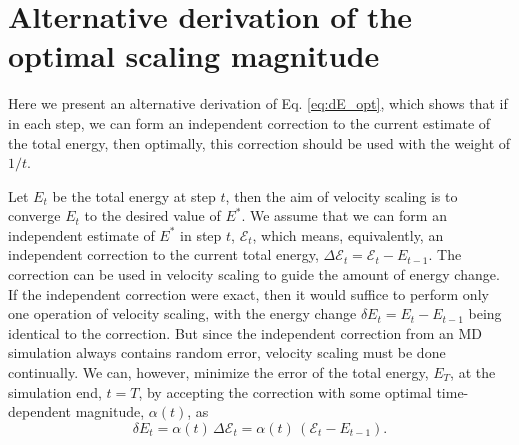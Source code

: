 \documentclass[reprint]{revtex4-1}
\begin{document}
\appendix


\section{\label{sec:error}
  Alternative derivation of
  the optimal scaling magnitude
}


Here we present an alternative derivation of Eq. \eqref{eq:dE_opt},
which shows that if in each step, we can form an independent correction
to the current estimate of the total energy,
then optimally,
this correction should be used
with the weight of $1/t$.

Let $E_t$ be the total energy at step $t$,
then the aim of velocity scaling is to converge $E_t$
to the desired value of $E^*$.
%
We assume that we can form an independent estimate of $E^*$
in step $t$, $\mathcal E_t$,
which means, equivalently, an independent correction
to the current total energy,
$\Delta \mathcal E_t = \mathcal E_t - E_{t-1}$.
%
The correction can be used in velocity scaling
to guide the amount of energy change.
%
If the independent correction were exact,
then it would suffice to perform
only one operation of velocity scaling,
with the energy change
$\delta E_t = E_t - E_{t-1}$
being identical to the correction.
%
But since
the independent correction from an MD simulation
always contains random error,
velocity scaling must be done continually.
%
We can, however, minimize the error
of the total energy, $E_T$,
at the simulation end, $t = T$,
by accepting the correction with some
optimal time-dependent magnitude, $\alpha(t)$,
as
%
\begin{equation}
  \delta E_t
  =
  \alpha(t) \, \Delta \mathcal E_t
  =
  \alpha(t) \, \left( \mathcal E_t - E_{t - 1} \right)
  .
  \label{eq:Eupdate}
\end{equation}
%
\end{document}
